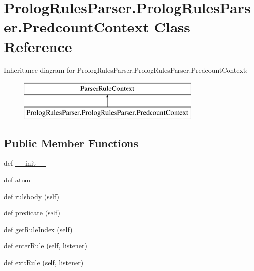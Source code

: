 \hypertarget{class_prolog_rules_parser_1_1_prolog_rules_parser_1_1_predcount_context}{}\section{Prolog\+Rules\+Parser.\+Prolog\+Rules\+Parser.\+Predcount\+Context Class Reference}
\label{class_prolog_rules_parser_1_1_prolog_rules_parser_1_1_predcount_context}
Inheritance diagram for Prolog\+Rules\+Parser.\+Prolog\+Rules\+Parser.\+Predcount\+Context\+:\begin{figure}[H]
\begin{center}
\leavevmode
\includegraphics[height=2.000000cm]{class_prolog_rules_parser_1_1_prolog_rules_parser_1_1_predcount_context}
\end{center}
\end{figure}
\subsection*{Public Member Functions}
\begin{DoxyCompactItemize}
\item 
def \hyperlink{class_prolog_rules_parser_1_1_prolog_rules_parser_1_1_predcount_context_a7837e1358659bfab6eb373b92d38a815}{\+\_\+\+\_\+init\+\_\+\+\_\+}
\item 
def \hyperlink{class_prolog_rules_parser_1_1_prolog_rules_parser_1_1_predcount_context_a0df38c740797c548a46652426b8824e1}{atom}
\item 
def \hyperlink{class_prolog_rules_parser_1_1_prolog_rules_parser_1_1_predcount_context_a54de76dfff1fe7e9f35b891832cf1771}{rulebody} (self)
\item 
def \hyperlink{class_prolog_rules_parser_1_1_prolog_rules_parser_1_1_predcount_context_ace356a956b3027bfb9a004ee047784c2}{predicate} (self)
\item 
def \hyperlink{class_prolog_rules_parser_1_1_prolog_rules_parser_1_1_predcount_context_a8ee46d759d408258c5b4813432f75725}{get\+Rule\+Index} (self)
\item 
def \hyperlink{class_prolog_rules_parser_1_1_prolog_rules_parser_1_1_predcount_context_a5a0060e6e8675c5aff674842485507f7}{enter\+Rule} (self, listener)
\item 
def \hyperlink{class_prolog_rules_parser_1_1_prolog_rules_parser_1_1_predcount_context_a06a84b0c80e4ac350a4d176c70a446e2}{exit\+Rule} (self, listener)
\end{DoxyCompactItemize}
